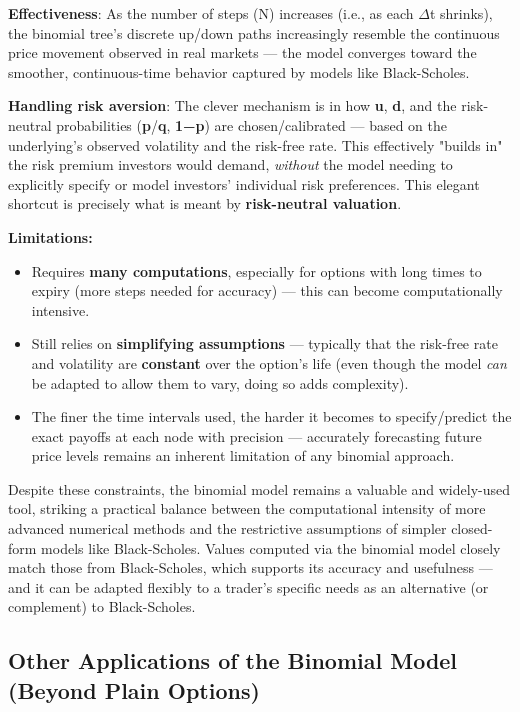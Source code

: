 \documentclass[12pt,openany]{book}
\theoremstyle{definition}
\theoremstyle{remark}
\begin{document}
\textbf{Effectiveness}: As the number of steps (N) increases (i.e., as each \ensuremath{\Delta}t shrinks), the binomial tree's discrete up/down paths increasingly resemble the continuous price movement observed in real markets — the model converges toward the smoother, continuous-time behavior captured by models like Black-Scholes.

\textbf{Handling risk aversion}: The clever mechanism is in how \textbf{u}, \textbf{d}, and the risk-neutral probabilities (\textbf{p}/\textbf{q}, \textbf{1−p}) are chosen/calibrated — based on the underlying's observed volatility and the risk-free rate. This effectively "builds in" the risk premium investors would demand, \emph{without} the model needing to explicitly specify or model investors' individual risk preferences. This elegant shortcut is precisely what is meant by \textbf{risk-neutral valuation}.

\textbf{Limitations:}
\begin{itemize}
\item Requires \textbf{many computations}, especially for options with long times to expiry (more steps needed for accuracy) — this can become computationally intensive.
\item Still relies on \textbf{simplifying assumptions} — typically that the risk-free rate and volatility are \textbf{constant} over the option's life (even though the model \emph{can} be adapted to allow them to vary, doing so adds complexity).
\item The finer the time intervals used, the harder it becomes to specify/predict the exact payoffs at each node with precision — accurately forecasting future price levels remains an inherent limitation of any binomial approach.
\end{itemize}
Despite these constraints, the binomial model remains a valuable and widely-used tool, striking a practical balance between the computational intensity of more advanced numerical methods and the restrictive assumptions of simpler closed-form models like Black-Scholes. Values computed via the binomial model closely match those from Black-Scholes, which supports its accuracy and usefulness — and it can be adapted flexibly to a trader's specific needs as an alternative (or complement) to Black-Scholes.

\subsection{Other Applications of the Binomial Model (Beyond Plain Options)}
\end{document}
